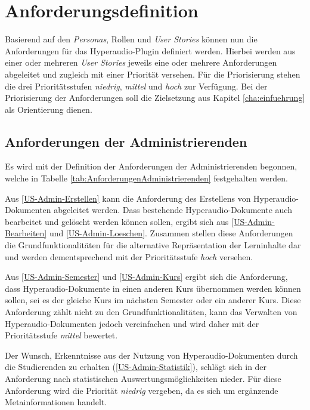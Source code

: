 \section{Anforderungsdefinition}
\label{sec:anforderungsdefinition}
Basierend auf den \textit{Personas}, Rollen und \textit{User Stories} können nun die Anforderungen für das Hyperaudio-Plugin definiert werden. Hierbei werden aus einer oder mehreren \textit{User Stories} jeweils eine oder mehrere Anforderungen abgeleitet und zugleich mit einer Priorität versehen. Für die Priorisierung stehen die drei Prioritätsstufen \textit{niedrig}, \textit{mittel} und \textit{hoch} zur Verfügung. Bei der Priorisierung der Anforderungen soll die Zielsetzung aus Kapitel \ref{cha:einfuehrung} als Orientierung dienen.

\subsection{Anforderungen der Administrierenden}
\label{sub:AnforderungenDerAdministrierenden}
Es wird mit der Definition der Anforderungen der Administrierenden begonnen, welche in Tabelle \ref{tab:AnforderungenAdministrierenden} festgehalten werden. 

Aus \ref{US-Admin-Erstellen} kann die Anforderung des Erstellens von Hyperaudio-Dokumenten abgeleitet werden. Dass bestehende Hyperaudio-Dokumente auch bearbeitet und gelöscht werden können sollen, ergibt sich aus \ref{US-Admin-Bearbeiten} und \ref{US-Admin-Loeschen}. Zusammen stellen diese Anforderungen die Grundfunktionalitäten für die alternative Repräsentation der Lerninhalte dar und werden dementsprechend mit der Prioritätsstufe \textit{hoch} versehen.

Aus \ref{US-Admin-Semester} und \ref{US-Admin-Kurs} ergibt sich die Anforderung, dass Hyperaudio-Dokumente in einen anderen Kurs übernommen werden können sollen, sei es der gleiche Kurs im nächsten Semester oder ein anderer Kurs. Diese Anforderung zählt nicht zu den Grundfunktionalitäten, kann das Verwalten von Hyperaudio-Dokumenten jedoch vereinfachen und wird daher mit der Prioritätsstufe \textit{mittel} bewertet.

Der Wunsch, Erkenntnisse aus der Nutzung von Hyperaudio-Dokumenten durch die Studierenden zu erhalten (\ref{US-Admin-Statistik}), schlägt sich in der Anforderung nach statistischen Auswertungsmöglichkeiten nieder. Für diese Anforderung wird die Priorität \textit{niedrig} vergeben, da es sich um ergänzende Metainformationen handelt.


